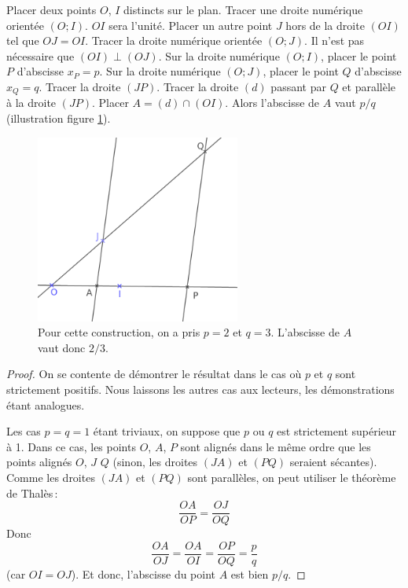 		Placer deux points $O$, $I$ distincts sur le plan. Tracer une droite numérique orientée $(O;I)$. $OI$ sera l'unité. Placer un autre point $J$ hors de la droite $(OI)$ tel que $OJ=OI$. Tracer la droite numérique orientée $(O;J)$. Il n'est pas nécessaire que $(OI)\perp (OJ)$. Sur la droite numérique $(O;I)$, placer le point $P$ d'abscisse $x_P=p$. Sur la droite numérique $(O;J)$, placer le point $Q$ d'abscisse $x_Q=q$. Tracer la droite $(JP)$. Tracer la droite $(d)$ passant par $Q$ et parallèle à la droite $(JP)$. Placer $A=(d)\cap(OI)$. Alors l'abscisse de $A$ vaut $p/q$ (illustration figure \ref{fig_psq}).

		\begin{figure}
			\includegraphics[width=0.6\textwidth]{image/calcul/constr_psq.png}
			\caption{Pour cette construction, on a pris $p=2$ et $q=3$. L'abscisse de $A$ vaut donc $2/3$.}
			\label{fig_psq}
		\end{figure}

		\begin{proof}
			On se contente de démontrer le résultat dans le cas où $p$ et $q$ sont strictement positifs. Nous laissons les autres cas aux lecteurs, les démonstrations étant analogues.

			Les cas $p=q=1$ étant triviaux, on suppose que $p$ ou $q$ est strictement supérieur à 1. Dans ce cas, les points $O$, $A$, $P$ sont alignés dans le même ordre que les points alignés $O$, $J$ $Q$ (sinon, les droites $(JA)$ et $(PQ)$ seraient sécantes). Comme les droites $(JA)$ et $(PQ)$ sont parallèles, on peut utiliser le théorème de Thalès\,:
			\begin{equation}
				\frac{OA}{OP}=\frac{OJ}{OQ}
			\end{equation}
			Donc
			\begin{equation}
				\frac{OA}{OJ}=\frac{OA}{OI}=\frac{OP}{OQ}=\frac{p}{q}
			\end{equation}
			(car $OI=OJ$). Et donc, l'abscisse du point $A$ est bien $p/q$.
		\end{proof}

